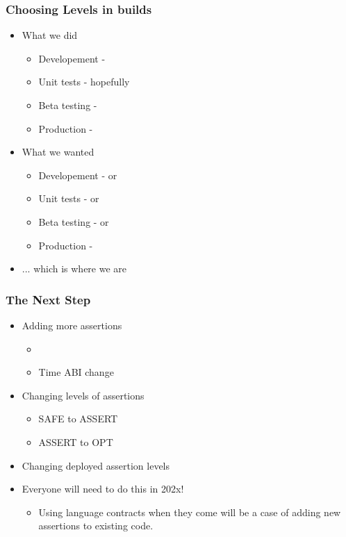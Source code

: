 \begin{frame}
  \frametitle{Choosing Levels in builds}
  \begin{itemize}
  \item What we did \pause
    \begin{itemize}
    \item Developement -  \pause
    \item Unit tests -  hopefully \pause
    \item Beta testing -  \pause
    \item Production -  \pause
    \end{itemize}
  \item What we wanted \pause
    \begin{itemize}
    \item Developement -  or  \pause
    \item Unit tests -  or  \pause
    \item Beta testing -  or  \pause
    \item Production -  \pause
    \end{itemize}
  \item ... which is where we are 
  \end{itemize}
\end{frame}

\begin{frame}
  \frametitle{The Next Step}

  \begin{itemize}
  \item Adding more assertions \pause
    \begin{itemize}
    \item {} \pause
    \item Time ABI change \pause
    \end{itemize}
  \item Changing levels of assertions \pause
    \begin{itemize}
    \item SAFE to ASSERT \pause
    \item ASSERT to OPT \pause
    \end{itemize}
  \item Changing deployed assertion levels \pause
  \item Everyone will need to do this in 202x! \pause
    \begin{itemize}
    \item Using language contracts when they come will be a case of adding new assertions to existing code.
    \end{itemize}
  \end{itemize}
\end{frame}

